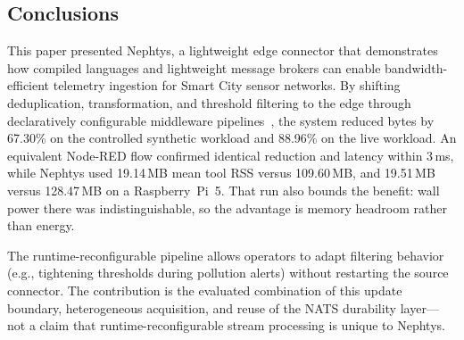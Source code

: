 \documentclass[conference]{IEEEtran}
\begin{document}
\begin{table}[b]
  \centering
  \caption{Qualitative comparison of overlapping edge-ingestion tools.}
  \label{tab:comparison}
  \scriptsize
\end{table}

\subsection{Conclusions}

This paper presented Nephtys, a lightweight edge connector that demonstrates how compiled languages and lightweight message brokers can enable bandwidth-efficient telemetry ingestion for Smart City sensor networks. By shifting deduplication, transformation, and threshold filtering to the edge through declaratively configurable middleware pipelines~\cite{assuncao2018stream}, the system reduced bytes by 67.30\% on the controlled synthetic workload and 88.96\% on the live workload. An equivalent Node-RED flow confirmed identical reduction and latency within 3\,ms, while Nephtys used 19.14\,MB mean tool RSS versus 109.60\,MB, and 19.51\,MB versus 128.47\,MB on a Raspberry~Pi~5. That run also bounds the benefit: wall power there was indistinguishable, so the advantage is memory headroom rather than energy.

The runtime-reconfigurable pipeline allows operators to adapt filtering behavior (e.g., tightening thresholds during pollution alerts) without restarting the source connector. The contribution is the evaluated combination of this update boundary, heterogeneous acquisition, and reuse of the NATS durability layer---not a claim that runtime-reconfigurable stream processing is unique to Nephtys.
\end{document}

